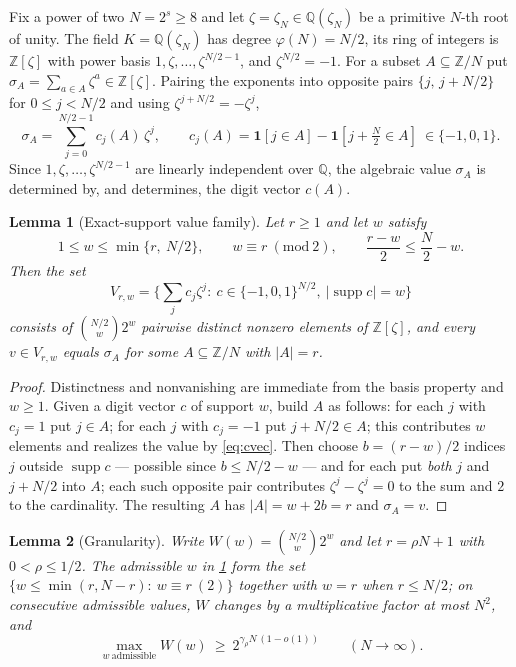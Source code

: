 \documentclass[11pt]{article}
\newtheorem{lemma}[lemma]{Lemma}
\theoremstyle{definition}
\newcommand{\Z}{\mathbb Z}
\newcommand{\Q}{\mathbb Q}
\newcommand{\supp}{\operatorname{supp}}
\begin{document}
Fix a power of two $N=2^s\ge8$ and let $\zeta=\zeta_N\in\Q(\zeta_N)$ be a primitive $N$-th root of unity.  The field $K=\Q(\zeta_N)$ has degree $\varphi(N)=N/2$, its ring of integers is $\Z[\zeta]$ with power basis $1,\zeta,\ldots,\zeta^{N/2-1}$, and $\zeta^{N/2}=-1$.  For a subset $A\subseteq\Z/N$ put $\sigma_A=\sum_{a\in A}\zeta^a\in\Z[\zeta]$.  Pairing the exponents into opposite pairs $\{j,\,j+N/2\}$ for $0\le j<N/2$ and using $\zeta^{j+N/2}=-\zeta^j$,
\begin{equation}\label{eq:cvec}
        \sigma_A=\sum_{j=0}^{N/2-1}c_j(A)\,\zeta^j,
        \qquad
        c_j(A)=\mathbf 1[j\in A]-\mathbf 1[j+\tfrac N2\in A]\ \in\{-1,0,1\}.
\end{equation}
Since $1,\zeta,\ldots,\zeta^{N/2-1}$ are linearly independent over $\Q$, the algebraic value $\sigma_A$ is determined by, and determines, the digit vector $c(A)$.

\begin{lemma}[Exact-support value family]\label{lem:value-family}
Let $r\ge1$ and let $w$ satisfy
\[
        1\le w\le\min\{r,\ N/2\},
        \qquad
        w\equiv r\ (\mathrm{mod}\ 2),
        \qquad
        \frac{r-w}{2}\le\frac N2-w .
\]
Then the set
\[
        V_{r,w}
        =\Big\{\textstyle\sum_j c_j\zeta^j:\ c\in\{-1,0,1\}^{N/2},\ |\supp c|=w\Big\}
\]
consists of $\binom{N/2}{w}2^{w}$ pairwise distinct nonzero elements of $\Z[\zeta]$, and every $v\in V_{r,w}$ equals $\sigma_A$ for some $A\subseteq\Z/N$ with $|A|=r$.
\end{lemma}

\begin{proof}
Distinctness and nonvanishing are immediate from the basis property and $w\ge1$.  Given a digit vector $c$ of support $w$, build $A$ as follows: for each $j$ with $c_j=1$ put $j\in A$; for each $j$ with $c_j=-1$ put $j+N/2\in A$; this contributes $w$ elements and realizes the value by \eqref{eq:cvec}.  Then choose $b=(r-w)/2$ indices $j$ outside $\supp c$ --- possible since $b\le N/2-w$ --- and for each put \emph{both} $j$ and $j+N/2$ into $A$; each such opposite pair contributes $\zeta^j-\zeta^j=0$ to the sum and $2$ to the cardinality.  The resulting $A$ has $|A|=w+2b=r$ and $\sigma_A=v$.
\end{proof}

\begin{lemma}[Granularity]\label{lem:granularity}
Write $W(w)=\binom{N/2}{w}2^w$ and let $r=\rho N+1$ with $0<\rho\le1/2$.  The admissible $w$ in \cref{lem:value-family} form the set $\{w\le\min(r,N-r):\ w\equiv r\ (2)\}$ together with $w=r$ when $r\le N/2$; on consecutive admissible values, $W$ changes by a multiplicative factor at most $N^2$, and
\[
        \max_{w\ \mathrm{admissible}}W(w)\ \ge\ 2^{\gamma_\rho N\,(1-o(1))}
        \qquad(N\to\infty).
\]
\end{lemma}
\end{document}
